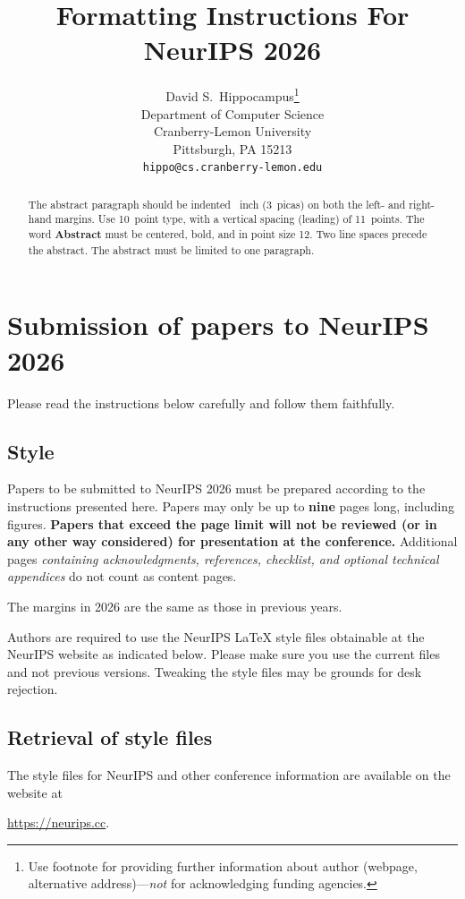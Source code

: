\documentclass{article}
\title{Formatting Instructions For NeurIPS 2026}
\author{%
  David S.~Hippocampus\thanks{Use footnote for providing further information
    about author (webpage, alternative address)---\emph{not} for acknowledging
    funding agencies.} \\
  Department of Computer Science\\
  Cranberry-Lemon University\\
  Pittsburgh, PA 15213 \\
  \texttt{hippo@cs.cranberry-lemon.edu} \\
}
\begin{document}
\maketitle


\begin{abstract}
  The abstract paragraph should be indented ~inch (3~picas) on both the left- and right-hand margins. Use 10~point type, with a vertical spacing (leading) of 11~points. The word \textbf{Abstract} must be centered, bold, and in point size 12. Two line spaces precede the abstract. The abstract must be limited to one paragraph.
\end{abstract}



\section{Submission of papers to NeurIPS 2026}


Please read the instructions below carefully and follow them faithfully.


\subsection{Style}


Papers to be submitted to NeurIPS 2026 must be prepared according to the
instructions presented here. Papers may only be up to {\bf nine} pages long, including figures. \textbf{Papers that exceed the page limit will not be reviewed (or in any other way considered) for presentation at the conference.}
Additional pages \emph{containing acknowledgments, references, checklist, and optional technical appendices} do not count as content pages.


The margins in 2026 are the same as those in previous years.


Authors are required to use the NeurIPS \LaTeX{} style files obtainable at the NeurIPS website as indicated below. Please make sure you use the current files and not previous versions. Tweaking the style files may be grounds for desk rejection.


\subsection{Retrieval of style files}


The style files for NeurIPS and other conference information are available on the website at
\begin{center}
  \url{https://neurips.cc}.
\end{center}
\end{document}
